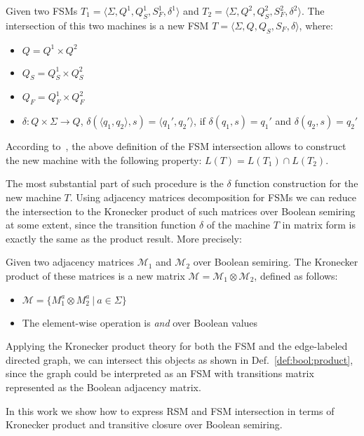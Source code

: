 \begin{definition}
\label{def:fsm:intersection}
Given two FSMs $T_1 = \langle \Sigma, Q^1, Q_S^1, S_F^1, \delta^1 \rangle$ 
and $T_2 = \langle \Sigma, Q^2, Q_S^2, S_F^2, \delta^2 \rangle$. 
The intersection of this two machines is a new FSM 
$T = \langle \Sigma, Q, Q_S, S_F, \delta \rangle$, where:
\begin{itemize}
    \item $Q = Q^1 \times Q^2$
    \item $Q_S = Q_S^1 \times Q_S^2$
    \item $Q_F = Q_F^1 \times Q_F^2$
    \item $\delta: Q \times \Sigma \to Q$, 
    $\delta (\langle q_1, q_2 \rangle, s) = \langle q_1', q_2' \rangle$, 
    \newline if $\delta(q_1,s)=q_1'$ and $\delta(q_2,s)=q_2'$
\end{itemize}
\end{definition}

According to~\cite{automata:theory:10.5555/1177300}, the above definition 
of the FSM intersection allows to construct the new machine with 
the following property: $L(T) = L(T_1) \cap L(T_2)$. 

The most substantial part of such procedure is the $\delta$ function construction 
for the new machine $T$. Using adjacency matrices decomposition for FSMs we can 
reduce the intersection to the Kronecker product of such matrices over Boolean 
semiring at some extent, since the transition function $\delta$ of the machine
$T$ in matrix form is exactly the same as the product result. More precisely:

\begin{definition}
\label{def:bool:product}
Given two adjacency matrices $\mathcal{M}_1$ and $\mathcal{M}_2$ over Boolean semiring. 
The Kronecker product of these matrices is a new matrix 
$\mathcal{M} = \mathcal{M}_1 \otimes \mathcal{M}_2$, defined as follows:
\begin{itemize}
    \item $\mathcal{M} = \{ M_1^a \otimes M_2^a~|~a \in \Sigma \}$
    \item The element-wise operation is \textit{and} over Boolean values
\end{itemize}
\end{definition}

Applying the Kronecker product theory for both the FSM and the edge-labeled directed graph,
we can intersect this objects as shown in Def.~\ref{def:bool:product}, since the 
graph could be interpreted as an FSM with transitions matrix represented as 
the Boolean adjacency matrix.

In this work we show how to express RSM and FSM intersection in terms of 
Kronecker product and transitive closure over Boolean semiring.
